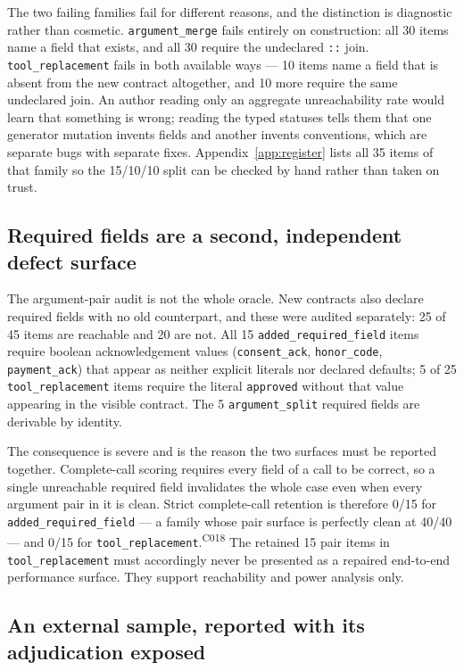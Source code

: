\documentclass[11pt]{article}
\newcommand{\ledger}[1]{\textsuperscript{\textsf{\scriptsize #1}}}
\newcommand{\dfam}[1]{\texttt{#1}}
\begin{document}
The two failing families fail for different reasons, and the distinction is
diagnostic rather than cosmetic. \dfam{argument\_merge} fails entirely on
construction: all 30 items name a field that exists, and all 30 require the
undeclared \texttt{::} join. \dfam{tool\_replacement} fails in both available
ways --- 10 items name a field that is absent from the new contract
altogether, and 10 more require the same undeclared join. An author reading
only an aggregate unreachability rate would learn that something is wrong;
reading the typed statuses tells them that one generator mutation invents
fields and another invents conventions, which are separate bugs with separate
fixes. Appendix~\ref{app:register} lists all 35 items of that family so the
15/10/10 split can be checked by hand rather than taken on trust.

\subsection{Required fields are a second, independent defect surface}
\label{sec:reqfield}

The argument-pair audit is not the whole oracle. New contracts also declare
required fields with no old counterpart, and these were audited separately:
25 of 45 items are reachable and 20 are not. All 15 \dfam{added\_required\_field}
items require boolean acknowledgement values (\texttt{consent\_ack},
\texttt{honor\_code}, \texttt{payment\_ack}) that appear as neither explicit
literals nor declared defaults; 5 of 25 \dfam{tool\_replacement} items require
the literal \texttt{approved} without that value appearing in the visible
contract. The 5 \dfam{argument\_split} required fields are derivable by
identity.

The consequence is severe and is the reason the two surfaces must be reported
together. Complete-call scoring requires every field of a call to be correct,
so a single unreachable required field invalidates the whole case even when
every argument pair in it is clean. Strict complete-call retention is
therefore 0/15 for \dfam{added\_required\_field} --- a family whose pair
surface is perfectly clean at 40/40 --- and 0/15 for
\dfam{tool\_replacement}.\ledger{C018} The retained 15 pair items in
\dfam{tool\_replacement} must accordingly never be presented as a repaired
end-to-end performance surface. They support reachability and power analysis
only.

\subsection{An external sample, reported with its adjudication exposed}
\label{sec:external}
\end{document}
